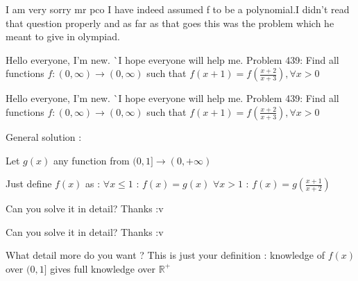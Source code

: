 \begin{solution}
	I am very sorry mr pco I have indeed assumed f to be a polynomial.I didn't read that question properly and as far as that goes this was the problem which he meant to give in olympiad.
\end{solution}



\begin{solution}
	Hello everyone, I'm new. ^^ I hope everyone will help me.
Problem 439: Find all functions $f:(0,\infty )\rightarrow (0,\infty )$ such that $f(x+1)=f(\frac{x+2}{x+3}),\forall x>0 $

\end{solution}



\begin{solution}
	\begin{tcolorbox}Hello everyone, I'm new. ^^ I hope everyone will help me.
Problem 439: Find all functions $f:(0,\infty )\rightarrow (0,\infty )$ such that $f(x+1)=f(\frac{x+2}{x+3}),\forall x>0 $\end{tcolorbox}

General solution :

Let $g(x)$ any function from $(0,1]\to (0,+\infty)$

Just define $f(x)$ as :
$\forall x\le 1$ : $f(x)=g(x)$
$\forall x>1$ : $f(x)=g(\frac{x+1}{x+2})$


\end{solution}



\begin{solution}
	Can you solve it in detail? Thanks :v
\end{solution}



\begin{solution}
	\begin{tcolorbox}Can you solve it in detail? Thanks :v\end{tcolorbox}

What detail more do you want ?
This is just your definition : knowledge of $f(x)$ over $(0,1]$ gives full knowledge over $\mathbb R^+$

\end{solution}



